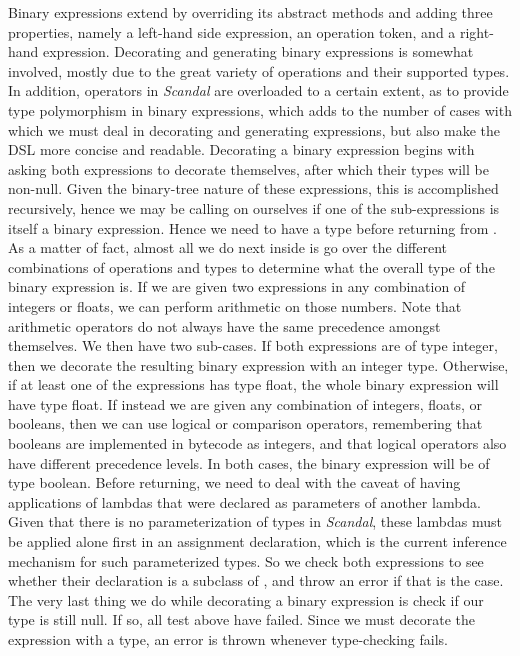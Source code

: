 Binary expressions extend  by overriding its abstract methods and adding three properties, namely a left-hand side expression, an operation token, and a right-hand expression. Decorating and generating binary expressions is somewhat involved, mostly due to the great variety of operations and their supported types. In addition, operators in \emph{Scandal} are overloaded to a certain extent, as to provide type polymorphism in binary expressions, which adds to the number of cases with which we must deal in decorating and generating expressions, but also make the DSL more concise and readable. Decorating a binary expression begins with asking both expressions to decorate themselves, after which their types will be non-null. Given the binary-tree nature of these expressions, this is accomplished recursively, hence we may be calling  on ourselves if one of the sub-expressions is itself a binary expression. Hence we need to have a type before returning from . As a matter of fact, almost all we do next inside  is go over the different combinations of operations and types to determine what the overall type of the binary expression is. If we are given two expressions in any combination of integers or floats, we can perform arithmetic on those numbers. Note that arithmetic operators do not always have the same precedence amongst themselves. We then have two sub-cases. If both expressions are of type integer, then we decorate the resulting binary expression with an integer type. Otherwise, if at least one of the expressions has type float, the whole binary expression will have type float. If instead we are given any combination of integers, floats, or booleans, then we can use logical or comparison operators, remembering that booleans are implemented in bytecode as integers, and that logical operators also have different precedence levels. In both cases, the binary expression will be of type boolean. Before returning, we need to deal with the caveat of having applications of lambdas that were declared as parameters of another lambda. Given that there is no parameterization of types in \emph{Scandal}, these lambdas must be applied alone first in an assignment declaration, which is the current inference mechanism for such parameterized types. So we check both expressions to see whether their declaration is a subclass of , and throw an error if that is the case. The very last thing we do while decorating a binary expression is check if our type is still null. If so, all test above have failed. Since we must decorate the expression with a type, an error is thrown whenever type-checking fails.

